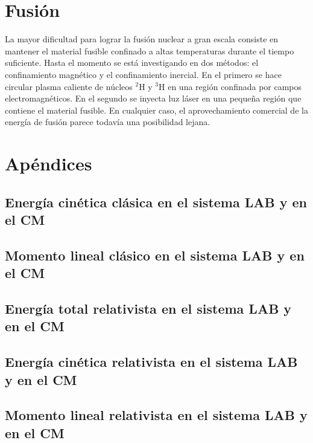 \section{Fusión}

La mayor dificultad para lograr la fusión nuclear a gran escala consiste en mantener el material fusible confinado a altas temperaturas durante el tiempo suficiente. Hasta el momento se está investigando en dos métodos: el confinamiento magnético y el confinamiento inercial. En el primero se hace circular plasma caliente de núcleos $^2$H y $^3$H en una región confinada por campos electromagnéticos. En el segundo se inyecta luz láser en una pequeña región que contiene el material fusible. En cualquier caso, el aprovechamiento comercial de la energía de fusión parece todavía una posibilidad lejana.

\section{Apéndices}

\subsection{Energía cinética clásica en el sistema LAB y en el CM}

\subsection{Momento lineal clásico en el sistema LAB y en el CM}

\subsection{Energía total relativista en el sistema LAB y en el CM}

\subsection{Energía cinética relativista en el sistema LAB y en el CM}

\subsection{Momento lineal relativista en el sistema LAB y en el CM}


